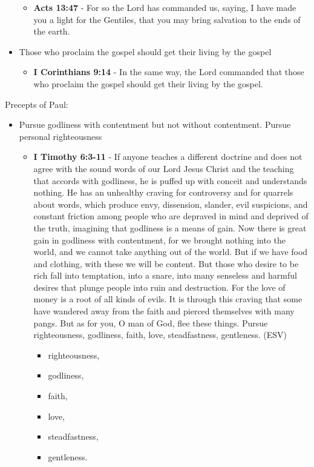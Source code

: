 \documentclass[11pt]{article}
\begin{document}
\begin{itemize}
\begin{itemize}
\item \textbf{Acts 13:47} - For so the Lord has commanded us, saying, I have made you a light for the Gentiles, that you may bring salvation to the ends of the earth.
\end{itemize}
\item Those who proclaim the gospel should get their living by the gospel
\begin{itemize}
\item \textbf{I Corinthians 9:14} - In the same way, the Lord commanded that those who proclaim the gospel should get their living by the gospel.
\end{itemize}
\end{itemize}

Precepts of Paul:
\begin{itemize}
\item Pursue godliness with contentment but not without contentment. Pursue personal righteousness
\begin{itemize}
\item \textbf{I Timothy 6:3-11} - If anyone teaches a different doctrine and does not agree with the sound words of our Lord Jesus Christ and the teaching that accords with godliness, he is puffed up with conceit and understands nothing. He has an unhealthy craving for controversy and for quarrels about words, which produce envy, dissension, slander, evil suspicions, and constant friction among people who are depraved in mind and deprived of the truth, imagining that godliness is a means of gain.  Now there is great gain in godliness with contentment, for we brought nothing into the world, and we cannot take anything out of the world.  But if we have food and clothing, with these we will be content.  But those who desire to be rich fall into temptation, into a snare, into many senseless and harmful desires that plunge people into ruin and destruction.  For the love of money is a root of all kinds of evils. It is through this craving that some have wandered away from the faith and pierced themselves with many pangs.  But as for you, O man of God, flee these things. Pursue righteousness, godliness, faith, love, steadfastness, gentleness. (ESV)
\begin{itemize}
\item righteousness,
\item godliness,
\item faith,
\item love,
\item steadfastness,
\item gentleness.
\end{itemize}
\end{itemize}
\end{itemize}
\end{document}
